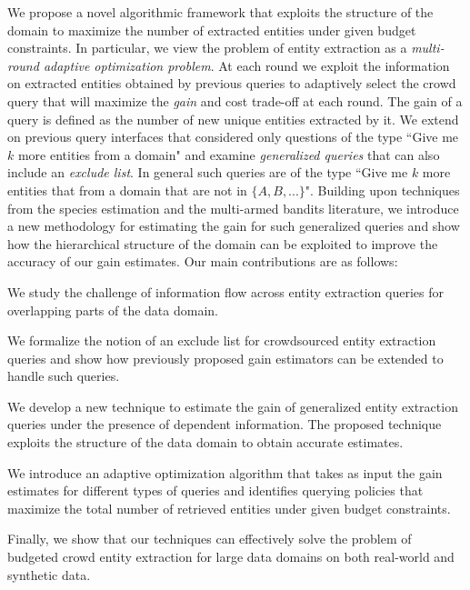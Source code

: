 We propose a novel algorithmic framework that exploits the structure of the domain to maximize the number of extracted entities under given budget constraints. In particular, we view the problem of entity extraction as a {\em multi-round adaptive optimization problem}. At  each round we exploit the information on extracted entities obtained by previous queries to adaptively select the crowd query that will maximize the {\em gain} and cost trade-off at each round. The gain of a query is defined as the number of new unique entities extracted by it. We extend on previous query interfaces that considered only questions of the type ``Give me $k$ more entities from a domain" and examine {\em generalized queries} that can also include an {\em exclude list}. In general such queries are of the type ``Give me $k$ more entities that from a domain that are not in $\{A, B, ...\}$". Building upon techniques from the species estimation and the multi-armed bandits literature, we introduce a new methodology for estimating the gain for such generalized queries and show how the hierarchical structure of the domain can be exploited to improve the accuracy of our gain estimates. Our main contributions are as follows:

\squishlist
\item We study the challenge of information flow across entity extraction queries for overlapping parts of the data domain.
\item We formalize the notion of an exclude list for crowdsourced entity extraction queries and show how previously proposed gain estimators can be extended to handle such queries.
\item We develop a new technique to estimate the gain of generalized entity extraction queries under the presence of dependent information. The proposed technique exploits the structure of the data domain to obtain accurate estimates. 
\item We introduce an adaptive optimization algorithm that takes as input the gain estimates for different types of queries and identifies querying policies that maximize the total number of retrieved entities under given budget constraints. 
\item Finally, we show that our techniques can effectively solve the problem of budgeted crowd entity extraction for large data domains on both real-world and synthetic data.
\squishend

